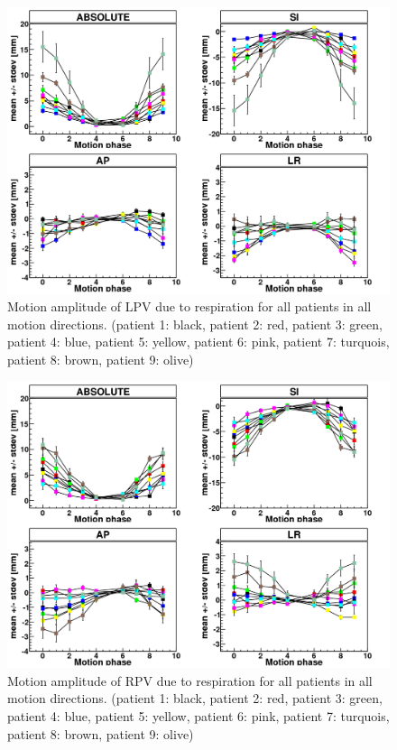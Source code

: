 \documentclass[type=dr, dr=rernat, accentcolor=tud7b,colorbacktitle, bigchapter, openright, twoside, 12pt ]{tudthesis}
\begin{document}
\begin{figure}[H]
\begin{center}
 \includegraphics[scale=0.25]{MDACC_allPatients_RESP_LPV.png}
\caption{Motion amplitude of LPV due to respiration for all patients in all motion directions. (patient 1: black, patient 2: red, 
patient 3: green, patient 4: blue, patient 5: yellow, patient 6: pink, patient 7: turquois, patient 8: brown, patient 9: olive) }
\label{motion_resp_all_lpv}
\end{center}
\end{figure}

\begin{figure}[H]
\begin{center}
 \includegraphics[scale=0.25]{MDACC_allPatients_RESP_RPV.png}
\caption{Motion amplitude of RPV due to respiration for all patients in all motion directions. (patient 1: black, patient 2: red, 
patient 3: green, patient 4: blue, patient 5: yellow, patient 6: pink, patient 7: turquois, patient 8: brown, patient 9: olive) }
\label{motion_resp_all_rpv}
\end{center}
\end{figure}
\end{document}
